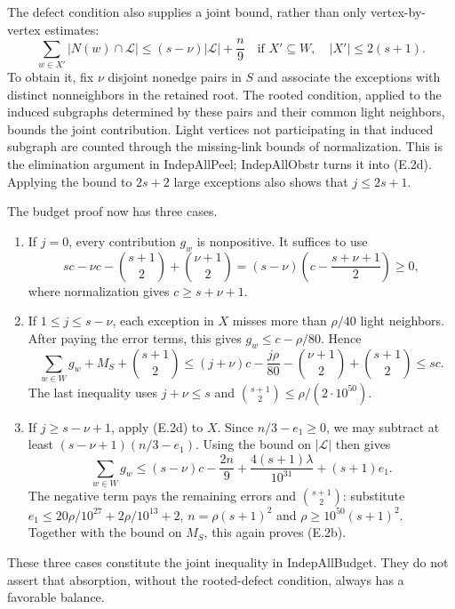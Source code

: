 \documentclass[english,11pt,a4paper]{article}
\providecommand{\tightlist}{\setlength{\itemsep}{0pt}\setlength{\parskip}{0pt}}
\newcounter{none}
\begin{document}
The defect condition also supplies a joint bound, rather than only vertex-by-vertex estimates: \[
\sum_{w\in X'}|N(w)\cap\mathcal L|
\le (s-\nu)|\mathcal L|+\frac n9
\quad\text{if }X'\subseteq W,\quad |X'|\le2(s+1).
\tag{E.2d}
\] To obtain it, fix \(\nu\) disjoint nonedge pairs in \(S\) and associate the exceptions with distinct nonneighbors in the retained root. The rooted condition, applied to the induced subgraphs determined by these pairs and their common light neighbors, bounds the joint contribution. Light vertices not participating in that induced subgraph are counted through the missing-link bounds of normalization. This is the elimination argument in IndepAllPeel; IndepAllObstr turns it into (E.2d). Applying the bound to \(2s+2\) large exceptions also shows that \(j\le2s+1\).


The budget proof now has three cases.

\begin{enumerate}
\def\labelenumi{\arabic{enumi}.}
\tightlist
\item
  If \(j=0\), every contribution \(g_w\) is nonpositive. It suffices to use \[
  sc-\nu c-\binom{s+1}2+\binom{\nu+1}2
  =(s-\nu)\left(c-\frac{s+\nu+1}{2}\right)\ge0,
  \] where normalization gives \(c\ge s+\nu+1\).
\item
  If \(1\le j\le s-\nu\), each exception in \(X\) misses more than \(\rho/40\) light neighbors. After paying the error terms, this gives \(g_w\le c-\rho/80\). Hence \[
  \sum_{w\in W}g_w+M_S+\binom{s+1}2
  \le(j+\nu)c-\frac{j\rho}{80}
       -\binom{\nu+1}2+\binom{s+1}2\le sc.
  \] The last inequality uses \(j+\nu\le s\) and \(\binom{s+1}2\le\rho/(2\cdot10^{50})\).
\item
  If \(j\ge s-\nu+1\), apply (E.2d) to \(X\). Since \(n/3-e_1\ge0\), we may subtract at least \((s-\nu+1)(n/3-e_1)\). Using the bound on \(|\mathcal L|\) then gives \[
  \sum_{w\in W}g_w
  \le (s-\nu)c-\frac{2n}{9}
     +\frac{4(s+1)\lambda}{10^{31}}+(s+1)e_1.
  \] The negative term pays the remaining errors and \(\binom{s+1}2\): substitute \(e_1\le20\rho/10^{27}+2\rho/10^{13}+2\), \(n=\rho(s+1)^2\) and \(\rho\ge10^{50}(s+1)^2\). Together with the bound on \(M_S\), this again proves (E.2b).
\end{enumerate}

These three cases constitute the joint inequality in IndepAllBudget. They do not assert that absorption, without the rooted-defect condition, always has a favorable balance.
\end{document}
